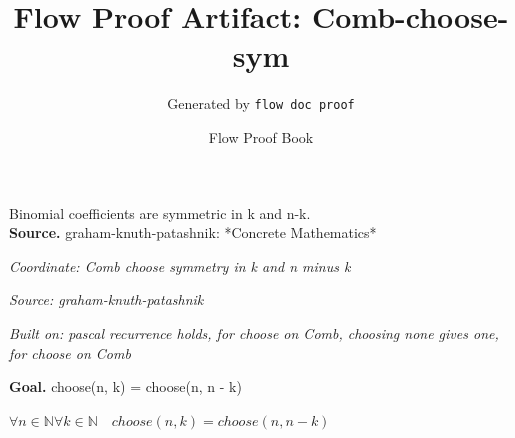 \documentclass[11pt]{article}
\title{Flow Proof Artifact: Comb-choose-sym}
\author{Generated by \texttt{flow doc proof}}
\date{Flow Proof Book}
\theoremstyle{definition}
\begin{document}
\maketitle
Binomial coefficients are symmetric in k and n-k.\\[0.5em]
\textbf{Source.} graham-knuth-patashnik: *Concrete Mathematics*\\[0.5em]
\bigskip
{}\par
\smallskip\noindent\textit{Coordinate: Comb \cdot choose \cdot symmetry in k and n minus k}\par
\smallskip\noindent\textit{Source: graham-knuth-patashnik}\par
\smallskip\noindent\textit{Built on: pascal recurrence holds, for choose on Comb, choosing none gives one, for choose on Comb}\par
\medskip
\noindent\textbf{Goal.} choose(n, k) = choose(n, n - k)\par
\noindent$\displaystyle \forall n \in \mathbb{N} \forall k \in \mathbb{N}\quad choose(n, k) = choose(n, n - k)$\par
\medskip
\noindent
\end{document}
